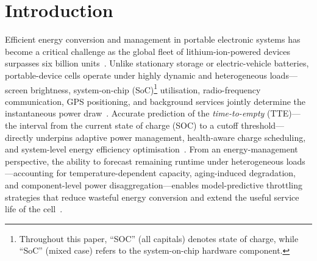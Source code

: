 \documentclass[5p,times,number]{elsarticle}
\begin{document}
\section{Introduction}\label{sec:intro}
Efficient energy conversion and management in portable electronic systems has become a critical challenge as the global fleet of lithium-ion-powered devices surpasses six billion units~\cite{Benkhelifa2016}.
Unlike stationary storage or electric-vehicle batteries, portable-device cells operate under highly dynamic and heterogeneous loads---screen brightness, system-on-chip (SoC)\footnote{Throughout this paper, ``SOC'' (all capitals) denotes state of charge, while ``SoC'' (mixed case) refers to the system-on-chip hardware component.} utilisation, radio-frequency communication, GPS positioning, and background services jointly determine the instantaneous power draw~\cite{Carroll2010,Chen2014}.
Accurate prediction of the \emph{time-to-empty} (TTE)---the interval from the current state of charge (SOC) to a cutoff threshold---directly underpins adaptive power management, health-aware charge scheduling, and system-level energy efficiency optimisation~\cite{Benkhelifa2016,Liu2019ECM}.
From an energy-management perspective, the ability to forecast remaining runtime under heterogeneous loads---accounting for temperature-dependent capacity, aging-induced degradation, and component-level power disaggregation---enables model-predictive throttling strategies that reduce wasteful energy conversion and extend the useful service life of the cell~\cite{Liu2019ECM,Liu2018ECM}.
\end{document}
